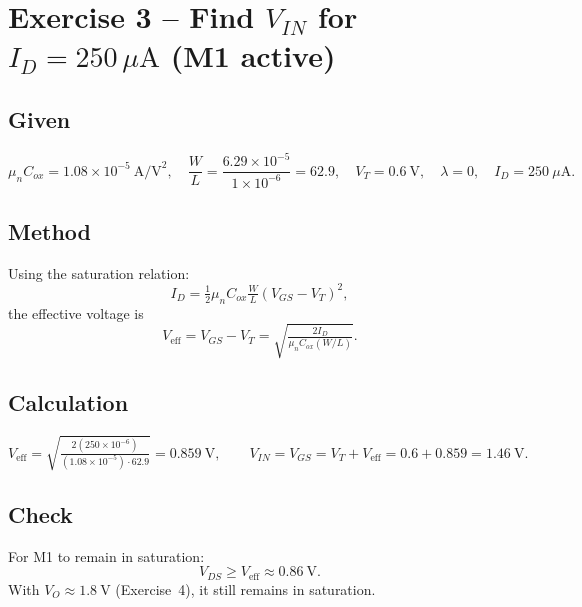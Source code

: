 \documentclass[main.tex]{subfiles}
\begin{document}
\section{Exercise 3 – Find \(V_{IN}\) for \(I_D=250\,\mu\text{A}\) (M1 active)}

\subsection*{Given}
\[
\mu_n C_{ox}=1.08\times10^{-5}\ \text{A/V}^2,\quad
\frac{W}{L}=\frac{6.29\times10^{-5}}{1\times10^{-6}}=62.9,\quad
V_T=0.6~\text{V},\quad
\lambda=0,\quad
I_D=250~\mu\text{A}.
\]

\subsection*{Method}
Using the saturation relation:
\begin{equation}
I_D=\tfrac{1}{2}\mu_n C_{ox}\tfrac{W}{L}(V_{GS}-V_T)^2,
\label{eq:3.1}
\end{equation}
the effective voltage is
\begin{equation}
V_{\text{eff}}=V_{GS}-V_T=\sqrt{\tfrac{2I_D}{\mu_n C_{ox}(W/L)}}.
\label{eq:3.2}
\end{equation}

\subsection*{Calculation}
\[
V_{\text{eff}}=\sqrt{\tfrac{2(250\times10^{-6})}{(1.08\times10^{-5})\cdot 62.9}}
=0.859~\text{V},\qquad
\boxed{V_{IN}=V_{GS}=V_T+V_{\text{eff}}=0.6+0.859=1.46~\text{V}}.
\]

\subsection*{Check}
For M1 to remain in saturation:
\[
V_{DS}\ge V_{\text{eff}}\approx0.86~\text{V}.
\]
With \(V_O\approx1.8~\text{V}\) (Exercise~4), it still remains in saturation.
\end{document}
